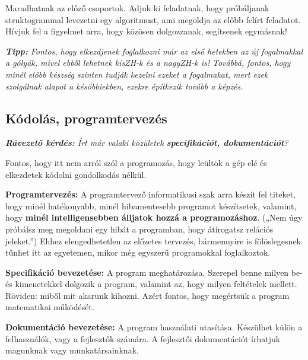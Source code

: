 \documentclass[../Main.tex]{subfiles}
\begin{document}
Maradhatnak az előző csoportok.
Adjuk ki feladatnak, hogy próbáljanak struktogrammal levezetni egy algoritmust, ami megoldja az előbb felírt feladatot.
Hívjuk fel a figyelmet arra, hogy közösen dolgozzanak, segítsenek egymásnak!

\begin{stuki}
    \begin{WHILE}{2}{}
        \begin{IF}{1}{}
            \ELSE
        \end{IF}
    \end{WHILE}
\end{stuki}

\textit{\textbf{Tipp:}
Fontos, hogy elkezdjenek foglalkozni már az első hetekben az új fogalmakkal a gólyák, mivel ebből lehetnek kisZH-k és a nagyZH-k is!
Továbbá, fontos, hogy minél előbb készség szinten tudják kezelni ezeket a fogalmakat, mert ezek szolgálnak alapot a későbbiekben, ezekre építkezik tovább a képzés.
}

\subsection{Kódolás, programtervezés}

\textit{\textbf{Rávezető kérdés:}
Írt már valaki közületek \textbf{specifikációt, dokumentációt}?
}

Fontos, hogy itt nem arról szól a programozás, hogy leültök a gép elé és elkezdetek kódolni gondolkodás nélkül.


\textbf{Programtervezés:}
A programtervező informatikusi szak arra készít fel titeket, hogy minél hatékonyabb, minél hibamentesebb programot készítsetek, valamint, hogy \textbf{minél intelligensebben álljatok hozzá a programozáshoz}.
(„Nem úgy próbálsz meg megoldani egy hibát a programban, hogy átírogatsz relációs jeleket.”)
Ehhez elengedhetetlen az előzetes tervezés, bármennyire is fölöslegesnek tűnhet itt az egyetemen, mikor még egyszerű programokkal foglalkoztok.

\textbf{Specifikáció bevezetése:}
A program meghatározása.
Szerepel benne milyen be- és kimenetekkel dolgozik a program, valamint az, hogy milyen feltételek mellett.
Röviden: miből mit akarunk kihozni.
Azért fontos, hogy megértsük a program matematikai működését.

\textbf{Dokumentáció bevezetése:}
A program használati utasítása.
Készülhet külön a felhasználók, vagy a fejlesztők számára.
A fejlesztői dokumentációt írhatjuk magunknak vagy munkatársainknak.
\end{document}
